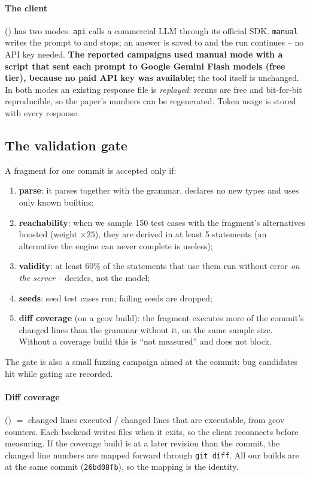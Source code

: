 \paragraph{The client} () has two modes. \texttt{api} calls
a commercial LLM through its official SDK. \texttt{manual} writes the prompt to
 and stops; an answer is saved to
 and the run continues -- no API key needed.
\textbf{The reported campaigns used manual mode with a script that sent each
prompt to Google Gemini Flash models (free tier), because no paid API key was
available;} the tool itself is unchanged. In both modes an existing response file is \emph{replayed}: reruns are
free and bit-for-bit reproducible, so the paper's numbers can be regenerated.
Token usage is stored with every response.

\subsection{The validation gate}
\label{sec:gate}

A fragment for one commit is accepted only if:
\begin{enumerate}
  \item \textbf{parse}: it parses together with the grammar, declares no new
    types and uses only known builtins;
  \item \textbf{reachability}: when we sample 150 test cases with the
    fragment's alternatives boosted (weight $\times 25$), they are derived in at
    least 5 statements (an alternative the engine can never complete is
    useless);
  \item \textbf{validity}: at least 60\% of the statements that use them run
    without error \emph{on the server} -- \pg decides, not the model;
  \item \textbf{seeds}: seed test cases run; failing seeds are dropped;
  \item \textbf{diff coverage} (on a gcov build): the fragment executes more of
    the commit's changed lines than the grammar without it, on the same sample
    size. Without a coverage build this is ``not measured'' and does not block.
\end{enumerate}
The gate is also a small fuzzing campaign aimed at the commit: bug candidates
hit while gating are recorded.

\paragraph{Diff coverage} () $=$ changed lines executed /
changed lines that are executable, from gcov counters. Each backend writes
 files when it exits, so the client reconnects before measuring.
If the coverage build is at a later revision than the commit, the changed line
numbers are mapped forward through \texttt{git diff}. All our builds are at the
same commit (\texttt{26bd08fb}), so the mapping is the identity.

